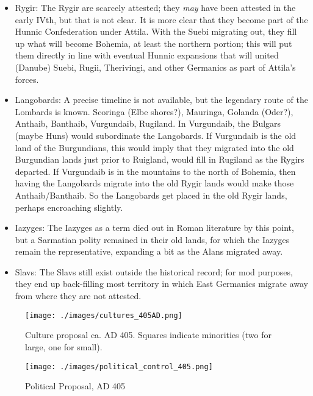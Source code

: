 \documentclass{article}
\begin{document}
\begin{itemize}
		\item Rygir:\newline
		The Rygir are scarcely attested; they \textit{may} have been attested in the early IVth, but that is not clear.
		It is more clear that they become part of the Hunnic Confederation under Attila.
		With the Suebi migrating out, they fill up what will become Bohemia, at least the northern portion; this will put them directly in line with eventual Hunnic expansions that will united (Danube) Suebi, Rugii, Therivingi, and other Germanics as part of Attila's forces.
		
		\item Langobards:\newline
		A precise timeline is not available, but the legendary route of the Lombards is known.
		Scoringa (Elbe shores?), Mauringa, Golanda (Oder?), Anthaib, Banthaib, Vurgundaib, Rugiland.
		In Vurgundaib, the Bulgars (maybe Huns) would subordinate the Langobards.
		If Vurgundaib is the old land of the Burgundians, this would imply that they migrated into the old Burgundian lands just prior to Ruigland, would fill in Rugiland as the Rygirs departed.
		If Vurgundaib is in the mountains to the north of Bohemia, then having the Langobards migrate into the old Rygir lands would make those Anthaib/Banthaib.
		So the Langobards get placed in the old Rygir lands, perhaps encroaching slightly.
		
		\item Iazyges:\newline
		The Iazyges as a term died out in Roman literature by this point, but a Sarmatian polity remained in their old lands, for which the Iazyges remain the representative, expanding a bit as the Alans migrated away.
		
		\item Slavs:\newline
		The Slavs still exist outside the historical record; for mod purposes, they end up back-filling most territory in which East Germanics migrate away from where they are not attested.
	\end{itemize}
	
	\newpage
	\begin{figure}[h!]
		\centering
		\texttt{[image: ./images/cultures\_405AD.png]}
		\caption{Culture proposal ca. AD 405. Squares indicate minorities (two for large, one for small).}
	\end{figure}
	
	\begin{figure}[h!]
		\centering
		\texttt{[image: ./images/political\_control\_405.png]}
		\caption{Political Proposal, AD 405}
	\end{figure}
	
\end{document}

